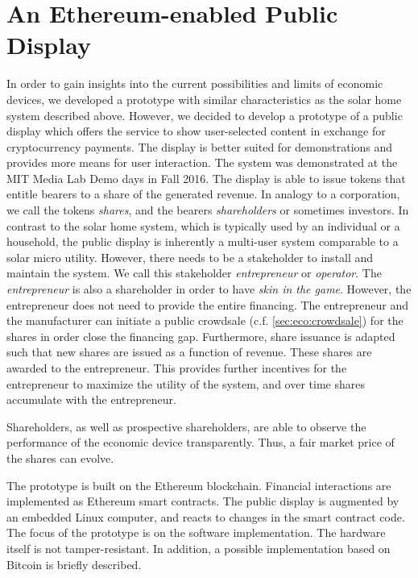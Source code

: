 \section{An Ethereum-enabled Public Display}
\label{sec:caseDisplay}

In order to gain insights into the current possibilities and limits of economic devices, we developed a prototype with similar characteristics as the solar home system described above. However, we decided to develop a prototype of a public display which offers the service to show user-selected content in exchange for cryptocurrency payments. The display is better suited for demonstrations and provides more means for user interaction. The system was demonstrated at the MIT Media Lab Demo days in Fall 2016. The display is able to issue tokens that entitle bearers to a share of the generated revenue. In analogy to a corporation, we call the tokens \emph{shares}, and the bearers \emph{shareholders} or sometimes investors. In contrast to the solar home system, which is typically used by an individual or a household, the public display is inherently a multi-user system comparable to a solar micro utility. However, there needs to be a stakeholder to install and maintain the system. We call this stakeholder \emph{entrepreneur} or \emph{operator}. The \emph{entrepreneur} is also a shareholder in order to have \emph{skin in the game}. However, the entrepreneur does not need to provide the entire financing. The entrepreneur and the manufacturer can initiate a public crowdsale (c.f. \ref{sec:eco:crowdsale}) for the shares in order close the financing gap. Furthermore, share issuance is adapted such that new shares are issued as a function of revenue. These shares are awarded to the entrepreneur. This provides further incentives for the entrepreneur to maximize the utility of the system, and over time shares accumulate with the entrepreneur. 

Shareholders, as well as prospective shareholders, are able to observe the performance of the economic device transparently. Thus, a fair market price of the shares can evolve. 

The prototype is built on the Ethereum blockchain. Financial interactions are implemented as Ethereum smart contracts. The public display is augmented by an embedded Linux computer, and reacts to changes in the smart contract code. The focus of the prototype is on the software implementation. The hardware itself is not tamper-resistant. In addition, a possible implementation based on Bitcoin is briefly described.


